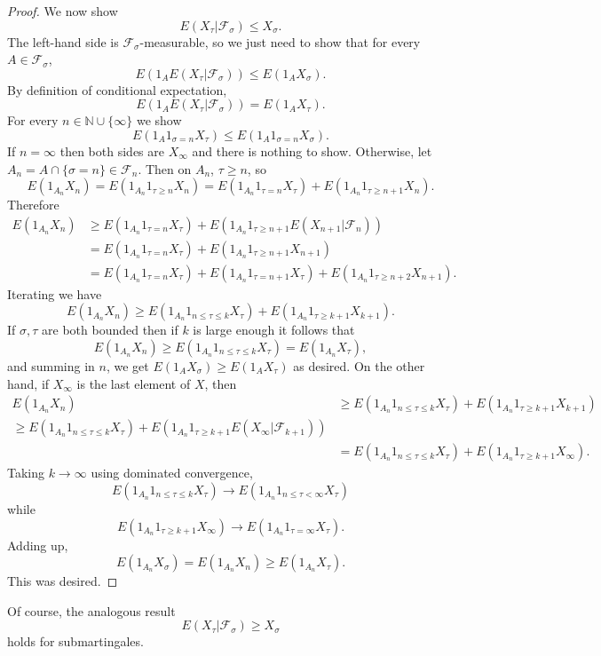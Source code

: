 \documentclass[12pt]{book}
\newcommand{\NN}{\mathbb{N}}
\theoremstyle{definition}
\begin{document}
\begin{proof}
We now show
$$E(X_\tau|\mathcal F_\sigma) \leq X_\sigma.$$
The left-hand side is $\mathcal F_\sigma$-measurable, so we just need to show that for every $A \in \mathcal F_\sigma$,
$$E(1_A E(X_\tau|\mathcal F_\sigma)) \leq E(1_A X_\sigma).$$
By definition of conditional expectation,
$$E(1_A E(X_\tau|\mathcal F_\sigma)) = E(1_A X_\tau).$$
For every $n \in \NN \cup \{\infty\}$ we show
$$E(1_A 1_{\sigma = n} X_\tau) \leq E(1_A 1_{\sigma = n} X_\sigma).$$
If $n = \infty$ then both sides are $X_\infty$ and there is nothing to show.
Otherwise, let $A_n = A \cap \{\sigma = n\} \in \mathcal F_n$.
Then on $A_n$, $\tau \geq n$, so
$$E(1_{A_n} X_n) = E(1_{A_n} 1_{\tau \geq n} X_n) = E(1_{A_n} 1_{\tau = n} X_\tau) + E(1_{A_n} 1_{\tau \geq n + 1} X_n).$$
Therefore
\begin{align*}
E(1_{A_n} X_n) &\geq E(1_{A_n} 1_{\tau = n} X_\tau) + E(1_{A_n} 1_{\tau \geq n + 1} E(X_{n+1}|\mathcal F_n)) \\
&= E(1_{A_n} 1_{\tau = n} X_\tau) + E(1_{A_n} 1_{\tau \geq n + 1} X_{n+1})\\
&= E(1_{A_n} 1_{\tau = n} X_\tau) + E(1_{A_n} 1_{\tau = n + 1} X_\tau) + E(1_{A_n} 1_{\tau \geq n + 2} X_{n+1}).
\end{align*}
Iterating we have
$$E(1_{A_n} X_n) \geq E(1_{A_n} 1_{n \leq \tau \leq k} X_\tau) + E(1_{A_n} 1_{\tau \geq k + 1} X_{k+1}).$$
If $\sigma,\tau$ are both bounded then if $k$ is large enough it follows that
$$E(1_{A_n} X_n) \geq E(1_{A_n} 1_{n \leq \tau \leq k} X_\tau) = E(1_{A_n} X_\tau),$$
and summing in $n$, we get $E(1_A X_\sigma) \geq E(1_A X_\tau)$ as desired.
On the other hand, if $X_\infty$ is the last element of $X$, then
\begin{align*}E(1_{A_n} X_n) &\geq E(1_{A_n} 1_{n \leq \tau \leq k} X_\tau) + E(1_{A_n} 1_{\tau \geq k + 1} X_{k+1})\\
\geq E(1_{A_n} 1_{n \leq \tau \leq k} X_\tau) + E(1_{A_n} 1_{\tau \geq k + 1} E(X_\infty|\mathcal F_{k+1}))\\
&= E(1_{A_n} 1_{n \leq \tau \leq k} X_\tau) + E(1_{A_n} 1_{\tau \geq k + 1} X_\infty).
\end{align*}
Taking $k \to \infty$ using dominated convergence,
$$E(1_{A_n} 1_{n \leq \tau \leq k} X_\tau) \to E(1_{A_n} 1_{n \leq \tau < \infty} X_\tau)$$
while
$$E(1_{A_n} 1_{\tau \geq k + 1} X_\infty) \to E(1_{A_n} 1_{\tau = \infty} X_\tau).$$
Adding up,
$$E(1_{A_n} X_\sigma) = E(1_{A_n} X_n) \geq E(1_{A_n} X_\tau).$$
This was desired.
\end{proof}

Of course, the analogous result
$$E(X_\tau|\mathcal F_\sigma) \geq X_\sigma$$
holds for submartingales.
\end{document}
